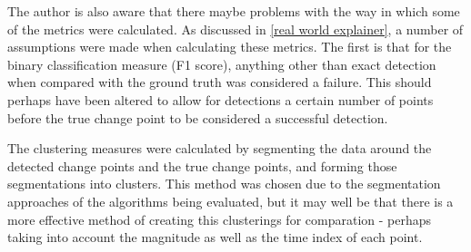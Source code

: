 \documentclass[../main.tex]{subfiles}
\begin{document}
The author is also aware that there maybe problems with the way in which some of the metrics were calculated. As discussed in \autoref{real world explainer}, a number of assumptions were made when calculating these metrics. The first is that for the binary classification measure (F1 score), anything other than exact detection when compared with the ground truth was considered a failure. This should perhaps have been altered to allow for detections a certain number of points before the true change point to be considered a successful detection.

The clustering measures were calculated by segmenting the data around the detected change points and the true change points, and forming those segmentations into clusters. This method was chosen due to the segmentation approaches of the algorithms being evaluated, but it may well be that there is a more effective method of creating this clusterings for comparation - perhaps taking into account the magnitude as well as the time index of each point.
\end{document}
